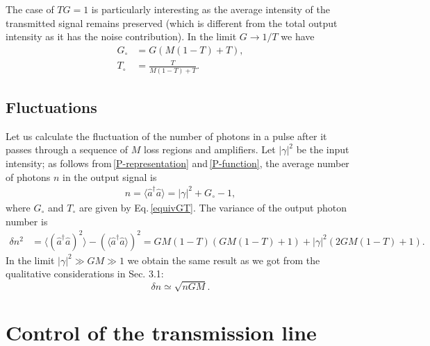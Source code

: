 \documentclass[a4paper]{article}
\newcommand{\be}{\begin{equation}}
\newcommand{\ee}{\end{equation}}
\begin{document}
The case of $TG=1$ is particularly interesting as the average intensity of the transmitted signal remains preserved (which is different from the total output intensity as it has the noise contribution). 
In the limit $G\to 1/T$ we have
\be\boxed{\begin{aligned}
\label{equivGT}
    G_\circ &= G(M(1-T)+T),\\
    T_\circ&=\frac{T}{M (1-T)+T}. 
\end{aligned}}
\ee

\subsection{Fluctuations}

Let us calculate the fluctuation of the number of photons in a pulse after it passes through a sequence of $M$ loss regions and amplifiers.
Let $|\gamma|^2$ be the input intensity;
as follows from\,\eqref{P-representation} and\,\eqref{P-function}, the average number of photons $n$ in the output signal is
\begin{equation}
\begin{split}
    n = \langle\hat{a}^\dagger\hat{a}\rangle = |\gamma|^2 + G_\circ - 1,
\end{split}
\end{equation}
where $G_\circ$ and $T_\circ$ are given by Eq.\,\eqref{equivGT}. 
The variance of the output photon number is
\begin{align}
    \delta n^2 &= \langle(\hat{a}^\dagger\hat{a})^2\rangle - (\langle\hat{a}^\dagger\hat{a}\rangle)^2 = G M (1 - T)(G M (1 - T) + 1) + |\gamma|^2(2 G M (1 - T) + 1).
    \label{fluctuation of intensity after M amp-s}
\end{align}
%
In the limit $|\gamma|^2\gg GM\gg1$ we obtain the same result as we got from the qualitative considerations in Sec. 3.1: 
\begin{equation}
\label{fluct}
    \delta n\simeq \sqrt{n G M}.
\end{equation}


\section{Control of the transmission line}

 
\end{document}
